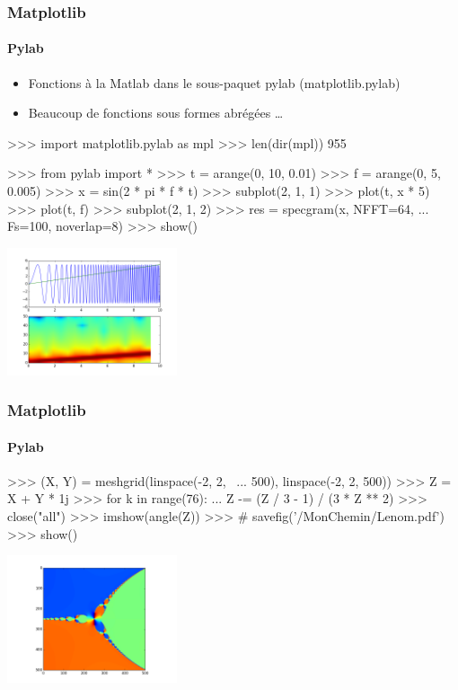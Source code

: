 \begin{frame}[fragile]
\frametitle{Matplotlib}
\framesubtitle{Pylab}
\begin{itemize}
 \item Fonctions à la Matlab dans le sous-paquet pylab (matplotlib.pylab)
 \item Beaucoup de fonctions sous formes abrégées \dots
\end{itemize}
\begin{minipage}[c]{5cm}
\begin{pythonConsole}
>>> import matplotlib.pylab as mpl
>>> len(dir(mpl))
955

>>> from pylab import *
>>> t = arange(0, 10, 0.01)
>>> f = arange(0, 5, 0.005)
>>> x = sin(2 * pi * f * t)
>>> subplot(2, 1, 1)
>>> plot(t, x * 5)
>>> plot(t, f)
>>> subplot(2, 1, 2)
>>> res = specgram(x, NFFT=64, 
... Fs=100, noverlap=8)
>>> show()
\end{pythonConsole}
\end{minipage}
\begin{minipage}[c]{5cm}
 \includegraphics[width=5cm]{./fig/specgram.png}
\end{minipage}
\end{frame}
\begin{frame}[fragile]
\frametitle{Matplotlib}
\framesubtitle{Pylab}
\begin{minipage}{5cm}
\begin{pythonConsole}
>>> (X, Y) = meshgrid(linspace(-2, 2, \
... 500), linspace(-2, 2, 500))
>>> Z = X + Y * 1j
>>> for k in range(76): 
...  Z -= (Z / 3 - 1) / (3 * Z ** 2)
>>> close("all")	
>>> imshow(angle(Z))
>>> # savefig('/MonChemin/Lenom.pdf')
>>> show()
\end{pythonConsole}
\end{minipage}
\begin{minipage}{5cm}
\includegraphics[width=5cm]{fig/fractal.png}
\end{minipage}
\end{frame}
